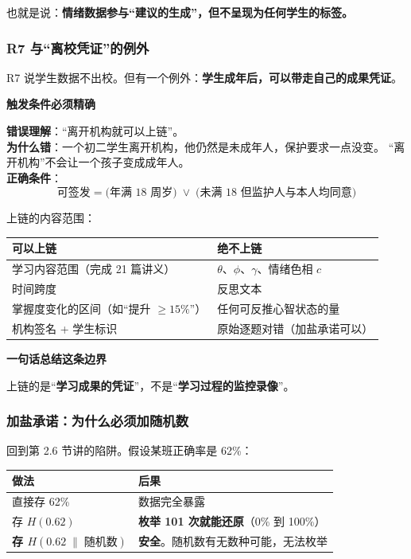 \documentclass[UTF8,a4paper,11pt]{ctexart}
\newenvironment{explainbox}[1]
{\begin{center}\begin{minipage}{0.94\textwidth}\colorbox{boxbg}{\parbox{0.92\textwidth}{\textbf{#1}\par\vspace{2pt}}}}
{\end{minipage}\end{center}}
\newcommand{\hl}[1]{\textcolor{blue!70!black}{\textbf{#1}}}
\newcommand{\warn}[1]{\textcolor{red!70!black}{\textbf{#1}}}
\begin{document}
也就是说：\textbf{情绪数据参与“建议的生成”，但不呈现为任何学生的标签。}

\subsubsection{R7 与“离校凭证”的例外}

R7 说学生数据不出校。但有一个例外：\textbf{学生成年后，可以带走自己的成果凭证}。

\begin{explainbox}{触发条件必须精确}
\warn{错误理解}：“离开机构就可以上链”。\\
\textbf{为什么错}：一个初二学生离开机构，他仍然是未成年人，保护要求一点没变。
“离开机构”不会让一个孩子变成成年人。\\[4pt]
\hl{正确条件}：
\begin{equation}
\text{可签发} = \big(\text{年满 18 周岁}\big) \;\lor\; \big(\text{未满 18 但监护人与本人均同意}\big)
\end{equation}
\end{explainbox}

上链的内容范围：

\begin{center}
\begin{tabular}{p{6.6cm}p{5.8cm}}
\toprule
\textbf{可以上链} & \textbf{绝不上链} \\
\midrule
学习内容范围（完成 21 篇讲义） & $\theta$、$\phi$、$\gamma$、情绪色相 $c$ \\
时间跨度 & 反思文本 \\
掌握度变化的区间（如“提升 $\geq 15\%$”） & 任何可反推心智状态的量 \\
机构签名 + 学生标识 & 原始逐题对错（加盐承诺可以） \\
\bottomrule
\end{tabular}
\end{center}

\begin{explainbox}{一句话总结这条边界}
上链的是“\textbf{学习成果的凭证}”，不是“\textbf{学习过程的监控录像}”。
\end{explainbox}

\subsubsection{加盐承诺：为什么必须加随机数}

回到第 2.6 节讲的陷阱。假设某班正确率是 62\%：

\begin{center}
\begin{tabular}{p{4.6cm}p{7.8cm}}
\toprule
\textbf{做法} & \textbf{后果} \\
\midrule
直接存 62\% & 数据完全暴露 \\
存 $H(0.62)$ & \warn{枚举 101 次就能还原}（0\% 到 100\%） \\
\textbf{存 $H(0.62 \;\|\; \text{随机数})$} & \hl{安全}。随机数有无数种可能，无法枚举 \\
\bottomrule
\end{tabular}
\end{center}
\end{document}
